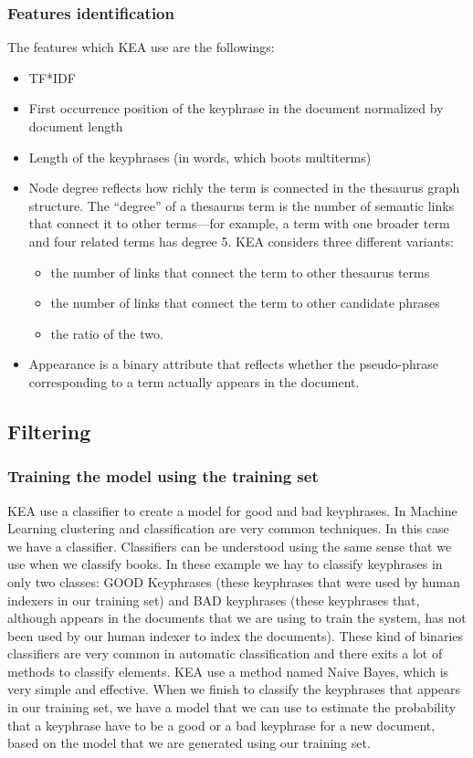 \subsubsection{Features identification}
The features which KEA use are the followings:
\begin{itemize}
\item TF*IDF
\item First occurrence position of the keyphrase in the document
normalized by document length
\item Length of the keyphrases (in words, which boots multiterms)
\item Node degree reflects how richly the term is connected in the
thesaurus graph structure. The “degree” of a thesaurus term is the
number of semantic links that connect it to other terms—for example, a
term with one broader term and four related terms has degree 5. KEA
considers three different variants:
\begin{itemize}
   \item the number of links that connect the term to other thesaurus terms
   \item the number of links that connect the term to other candidate phrases
   \item the ratio of the two.
\end{itemize}
\item Appearance is a binary attribute that reflects whether the
pseudo-phrase corresponding to a term actually appears in the
document.
\end{itemize}

\subsection{Filtering}
\subsubsection{Training the model using the training set}
KEA use a classifier to create a model for good and bad keyphrases. In
Machine Learning clustering and classification are very common
techniques. In this case we have a classifier. Classifiers can be
understood using the same sense that we use when we classify books. In
these example we hay to classify keyphrases in only two classes: GOOD
Keyphrases (these keyphrases that were used by human indexers in our
training set) and BAD keyphrases (these keyphrases that, although
appears in the documents that we are using to train the system, has
not been used by our human indexer to index the documents). These kind
of binaries classifiers are very common in automatic classification
and there exits a lot of methods to classify elements. KEA use a
method named Naive Bayes, which is very simple and effective. When we
finish to classify the keyphrases that appears in our training set, we
have a model that we can use to estimate the probability that a
keyphrase have to be a good or a bad keyphrase for a new document,
based on the model that we are generated using our training set.

